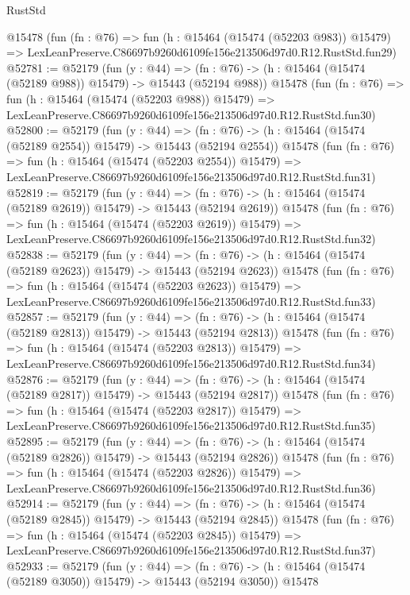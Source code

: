 \begin{lexlean}{RustStd}
\begin{coremodule}
    @15478
    (fun (fn : @76) =>
    fun (h : @15464 (@15474 (@52203 @983)) @15479) =>
    LexLeanPreserve.C86697b9260d6109fe156e213506d97d0.R12.RustStd.fun29)
@52781 := @52179
    (fun (y : @44) =>
    (fn : @76) -> (h : @15464 (@15474 (@52189 @988)) @15479) -> @15443 (@52194 @988))
    @15478
    (fun (fn : @76) =>
    fun (h : @15464 (@15474 (@52203 @988)) @15479) =>
    LexLeanPreserve.C86697b9260d6109fe156e213506d97d0.R12.RustStd.fun30)
@52800 := @52179
    (fun (y : @44) =>
    (fn : @76) -> (h : @15464 (@15474 (@52189 @2554)) @15479) -> @15443 (@52194 @2554))
    @15478
    (fun (fn : @76) =>
    fun (h : @15464 (@15474 (@52203 @2554)) @15479) =>
    LexLeanPreserve.C86697b9260d6109fe156e213506d97d0.R12.RustStd.fun31)
@52819 := @52179
    (fun (y : @44) =>
    (fn : @76) -> (h : @15464 (@15474 (@52189 @2619)) @15479) -> @15443 (@52194 @2619))
    @15478
    (fun (fn : @76) =>
    fun (h : @15464 (@15474 (@52203 @2619)) @15479) =>
    LexLeanPreserve.C86697b9260d6109fe156e213506d97d0.R12.RustStd.fun32)
@52838 := @52179
    (fun (y : @44) =>
    (fn : @76) -> (h : @15464 (@15474 (@52189 @2623)) @15479) -> @15443 (@52194 @2623))
    @15478
    (fun (fn : @76) =>
    fun (h : @15464 (@15474 (@52203 @2623)) @15479) =>
    LexLeanPreserve.C86697b9260d6109fe156e213506d97d0.R12.RustStd.fun33)
@52857 := @52179
    (fun (y : @44) =>
    (fn : @76) -> (h : @15464 (@15474 (@52189 @2813)) @15479) -> @15443 (@52194 @2813))
    @15478
    (fun (fn : @76) =>
    fun (h : @15464 (@15474 (@52203 @2813)) @15479) =>
    LexLeanPreserve.C86697b9260d6109fe156e213506d97d0.R12.RustStd.fun34)
@52876 := @52179
    (fun (y : @44) =>
    (fn : @76) -> (h : @15464 (@15474 (@52189 @2817)) @15479) -> @15443 (@52194 @2817))
    @15478
    (fun (fn : @76) =>
    fun (h : @15464 (@15474 (@52203 @2817)) @15479) =>
    LexLeanPreserve.C86697b9260d6109fe156e213506d97d0.R12.RustStd.fun35)
@52895 := @52179
    (fun (y : @44) =>
    (fn : @76) -> (h : @15464 (@15474 (@52189 @2826)) @15479) -> @15443 (@52194 @2826))
    @15478
    (fun (fn : @76) =>
    fun (h : @15464 (@15474 (@52203 @2826)) @15479) =>
    LexLeanPreserve.C86697b9260d6109fe156e213506d97d0.R12.RustStd.fun36)
@52914 := @52179
    (fun (y : @44) =>
    (fn : @76) -> (h : @15464 (@15474 (@52189 @2845)) @15479) -> @15443 (@52194 @2845))
    @15478
    (fun (fn : @76) =>
    fun (h : @15464 (@15474 (@52203 @2845)) @15479) =>
    LexLeanPreserve.C86697b9260d6109fe156e213506d97d0.R12.RustStd.fun37)
@52933 := @52179
    (fun (y : @44) =>
    (fn : @76) -> (h : @15464 (@15474 (@52189 @3050)) @15479) -> @15443 (@52194 @3050))
    @15478

\end{coremodule}
\end{lexlean}
